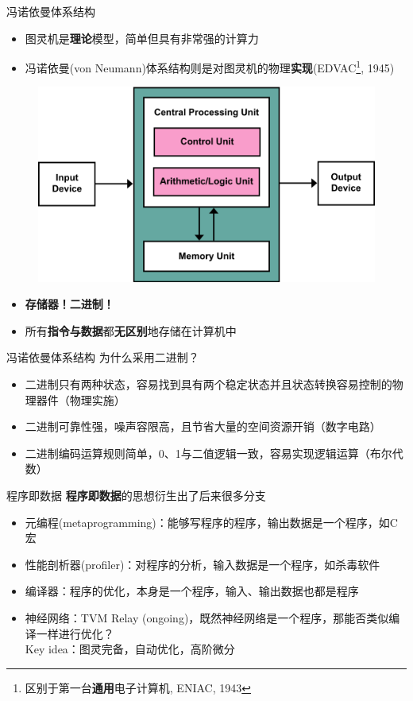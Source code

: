 \documentclass{myslide}
\begin{document}
\begin{frame}{冯诺依曼体系结构}
\begin{itemize}
	\item 图灵机是\textbf{理论}模型，简单但具有非常强的计算力
	\item 冯诺依曼(von Neumann)体系结构则是对图灵机的物理\textbf{实现}(EDVAC\footnote{区别于第一台\textbf{通用}电子计算机, ENIAC, 1943}, 1945)
\end{itemize}
\begin{figure}
\centering
\includegraphics[width=0.4\linewidth]{fig/Lecture2/Von_Neumann_Architecture.png}
\end{figure}
\begin{itemize}[<+->]
	\item \textbf{存储器！二进制！}
	\item 所有\textbf{指令与数据}都\textbf{无区别}地存储在计算机中
\end{itemize}
\end{frame}

\begin{frame}{冯诺依曼体系结构}
为什么采用二进制？
\begin{itemize}
	\item 二进制只有两种状态，容易找到具有两个稳定状态并且状态转换容易控制的物理器件（物理实施）
	\item 二进制可靠性强，噪声容限高，且节省大量的空间资源开销（数字电路）
	\item 二进制编码运算规则简单，0、1与二值逻辑一致，容易实现逻辑运算（布尔代数）
\end{itemize}
\end{frame}

\begin{frame}{程序即数据}
\textbf{程序即数据}的思想衍生出了后来很多分支
\begin{itemize}[<+->]
	\item 元编程(metaprogramming)：能够写程序的程序，输出数据是一个程序，如C宏
	\item 性能剖析器(profiler)：对程序的分析，输入数据是一个程序，如杀毒软件
	\item 编译器：程序的优化，本身是一个程序，输入、输出数据也都是程序
	\item 神经网络：TVM Relay (ongoing)，既然神经网络是一个程序，那能否类似编译一样进行优化？\\
	Key idea：图灵完备，自动优化，高阶微分
\end{itemize}
\end{frame}
\end{document}
